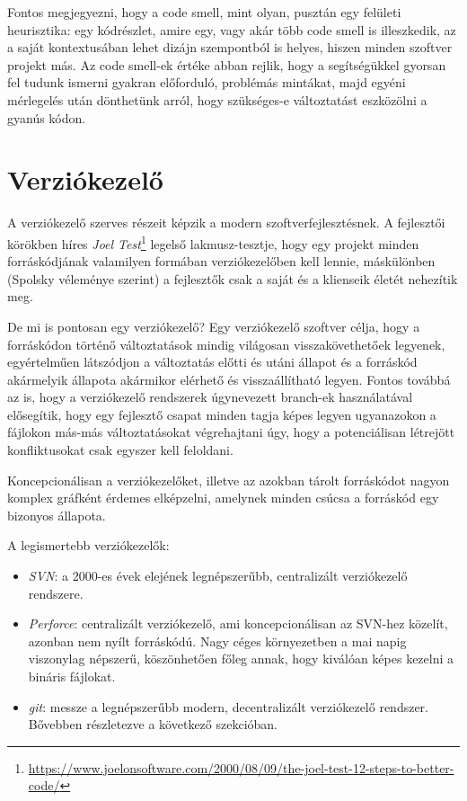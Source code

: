 Fontos megjegyezni, hogy a code smell, mint olyan, pusztán egy felületi heurisztika: egy kódrészlet, amire egy, vagy akár több code smell is illeszkedik, az a saját kontextusában lehet dizájn szempontból is helyes, hiszen minden szoftver projekt más. Az code smell-ek értéke abban rejlik, hogy a segítségükkel gyorsan fel tudunk ismerni gyakran előforduló, problémás mintákat, majd egyéni mérlegelés után dönthetünk arról, hogy szükséges-e változtatást eszközölni a gyanús kódon.

\section{Verziókezelő}
\label{section:version_control}

A verziókezelő szerves részeit képzik a modern szoftverfejlesztésnek. A fejlesztői körökben híres \textit{Joel Test}\footnote{\url{https://www.joelonsoftware.com/2000/08/09/the-joel-test-12-steps-to-better-code/}} legelső lakmusz-tesztje, hogy egy projekt minden forráskódjának valamilyen formában verziókezelőben kell lennie, máskülönben (Spolsky véleménye szerint) a fejlesztők csak a saját és a klienseik életét nehezítik meg.

De mi is pontosan egy verziókezelő? Egy verziókezelő szoftver célja, hogy a forráskódon történő változtatások mindig világosan visszakövethetőek legyenek, egyértelműen látszódjon a változtatás előtti és utáni állapot és a forráskód akármelyik állapota akármikor elérhető és visszaállítható legyen. Fontos továbbá az is, hogy a verziókezelő rendszerek úgynevezett branch-ek használatával elősegítik, hogy egy fejlesztő csapat minden tagja képes legyen ugyanazokon a fájlokon más-más változtatásokat végrehajtani úgy, hogy a potenciálisan létrejött konfliktusokat csak egyszer kell feloldani.

Koncepcionálisan a verziókezelőket, illetve az azokban tárolt forráskódot nagyon komplex gráfként érdemes elképzelni, amelynek minden csúcsa a forráskód egy bizonyos állapota.

A legismertebb verziókezelők:
\begin{itemize}
    \item \textit{SVN}: a 2000-es évek elejének legnépszerűbb, centralizált verziókezelő rendszere.
    \item \textit{Perforce}: centralizált verziókezelő, ami koncepcionálisan az SVN-hez közelít, azonban nem nyílt forráskódú. Nagy céges környezetben a mai napig viszonylag népszerű, köszönhetően főleg annak, hogy kiválóan képes kezelni a bináris fájlokat.
    \item \textit{git}: messze a legnépszerűbb modern, decentralizált verziókezelő rendszer. Bővebben részletezve a következő szekcióban.
\end{itemize}

